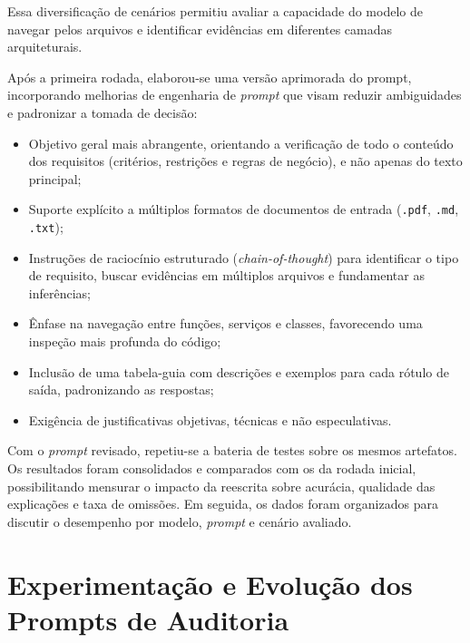 Essa diversificação de cenários permitiu avaliar a capacidade do modelo de navegar pelos arquivos e identificar evidências em diferentes camadas arquiteturais. 

Após a primeira rodada, elaborou-se uma versão aprimorada do prompt, incorporando melhorias de engenharia de \textit{prompt} que visam reduzir ambiguidades e padronizar a tomada de decisão:

\begin{itemize}
    \item Objetivo geral mais abrangente, orientando a verificação de todo o conteúdo dos requisitos (critérios, restrições e regras de negócio), e não apenas do texto principal;
    \item Suporte explícito a múltiplos formatos de documentos de entrada (\texttt{.pdf}, \texttt{.md}, \texttt{.txt});
    \item Instruções de raciocínio estruturado (\textit{chain-of-thought}) para identificar o tipo de requisito, buscar evidências em múltiplos arquivos e fundamentar as inferências;
    \item Ênfase na navegação entre funções, serviços e classes, favorecendo uma inspeção mais profunda do código;
    \item Inclusão de uma tabela-guia com descrições e exemplos para cada rótulo de saída, padronizando as respostas;
    \item Exigência de justificativas objetivas, técnicas e não especulativas.
\end{itemize}

Com o \textit{prompt} revisado, repetiu-se a bateria de testes sobre os mesmos artefatos. Os resultados foram consolidados e comparados com os da rodada inicial, possibilitando mensurar o impacto da reescrita sobre acurácia, qualidade das explicações e taxa de omissões. Em seguida, os dados foram organizados para discutir o desempenho por modelo, \textit{prompt} e cenário avaliado.

\section{Experimentação e Evolução dos Prompts de Auditoria}

